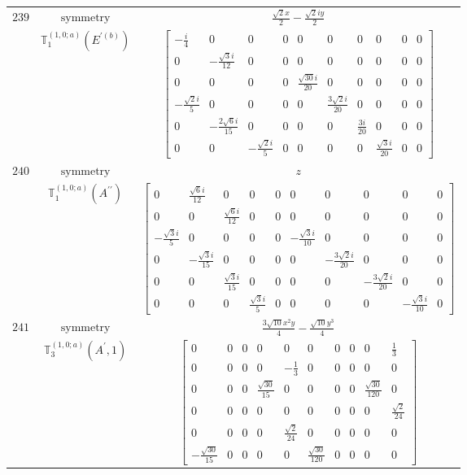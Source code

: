 \documentclass[fleqn,8pt,landscape]{jsarticle}
\begin{document}
\begin{longtable}{ccc}
$ 239 $ & $ \text{symmetry} $ & $ \frac{\sqrt{2} x}{2} - \frac{\sqrt{2} i y}{2} $ \\
$  $ & $ \mathbb{T}_{1}^{(1,0;a)}(E^{\prime(b)}) $ & $ \begin{bmatrix} - \frac{i}{4} & 0 & 0 & 0 & 0 & 0 & 0 & 0 & 0 & 0 \\ 0 & - \frac{\sqrt{3} i}{12} & 0 & 0 & 0 & 0 & 0 & 0 & 0 & 0 \\ 0 & 0 & 0 & 0 & \frac{\sqrt{30} i}{20} & 0 & 0 & 0 & 0 & 0 \\ - \frac{\sqrt{2} i}{5} & 0 & 0 & 0 & 0 & \frac{3 \sqrt{2} i}{20} & 0 & 0 & 0 & 0 \\ 0 & - \frac{2 \sqrt{6} i}{15} & 0 & 0 & 0 & 0 & \frac{3 i}{20} & 0 & 0 & 0 \\ 0 & 0 & - \frac{\sqrt{2} i}{5} & 0 & 0 & 0 & 0 & \frac{\sqrt{3} i}{20} & 0 & 0 \end{bmatrix} $ \\ \hline
$ 240 $ & $ \text{symmetry} $ & $ z $ \\
$  $ & $ \mathbb{T}_{1}^{(1,0;a)}(A^{\prime\prime}) $ & $ \begin{bmatrix} 0 & \frac{\sqrt{6} i}{12} & 0 & 0 & 0 & 0 & 0 & 0 & 0 & 0 \\ 0 & 0 & \frac{\sqrt{6} i}{12} & 0 & 0 & 0 & 0 & 0 & 0 & 0 \\ - \frac{\sqrt{3} i}{5} & 0 & 0 & 0 & 0 & - \frac{\sqrt{3} i}{10} & 0 & 0 & 0 & 0 \\ 0 & - \frac{\sqrt{3} i}{15} & 0 & 0 & 0 & 0 & - \frac{3 \sqrt{2} i}{20} & 0 & 0 & 0 \\ 0 & 0 & \frac{\sqrt{3} i}{15} & 0 & 0 & 0 & 0 & - \frac{3 \sqrt{2} i}{20} & 0 & 0 \\ 0 & 0 & 0 & \frac{\sqrt{3} i}{5} & 0 & 0 & 0 & 0 & - \frac{\sqrt{3} i}{10} & 0 \end{bmatrix} $ \\ \hline
$ 241 $ & $ \text{symmetry} $ & $ \frac{3 \sqrt{10} x^{2} y}{4} - \frac{\sqrt{10} y^{3}}{4} $ \\
$  $ & $ \mathbb{T}_{3}^{(1,0;a)}(A^{\prime},1) $ & $ \begin{bmatrix} 0 & 0 & 0 & 0 & 0 & 0 & 0 & 0 & 0 & \frac{1}{3} \\ 0 & 0 & 0 & 0 & - \frac{1}{3} & 0 & 0 & 0 & 0 & 0 \\ 0 & 0 & 0 & \frac{\sqrt{30}}{15} & 0 & 0 & 0 & 0 & \frac{\sqrt{30}}{120} & 0 \\ 0 & 0 & 0 & 0 & 0 & 0 & 0 & 0 & 0 & \frac{\sqrt{2}}{24} \\ 0 & 0 & 0 & 0 & \frac{\sqrt{2}}{24} & 0 & 0 & 0 & 0 & 0 \\ - \frac{\sqrt{30}}{15} & 0 & 0 & 0 & 0 & \frac{\sqrt{30}}{120} & 0 & 0 & 0 & 0 \end{bmatrix} $ \\ \hline

\end{longtable}
\end{document}
